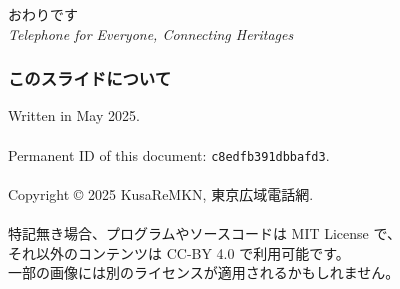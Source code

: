 \documentclass[
  lualatex,
  aspectratio=169,
  14pt
]{beamer}
\begin{document}
\begin{frame}[standout]
  おわりです\\[3\baselineskip]
  {\small\mdseries \textit{Telephone for Everyone, Connecting Heritages}}
  \\[-4\baselineskip]
\end{frame}

\begin{frame}
  \frametitle{このスライドについて}

  Written in May 2025.
  \\~\\[-.5\baselineskip]

  Permanent ID of this document: \texttt{c8edfb391dbbafd3}.
  \\~\\[-.5\baselineskip]

  Copyright © 2025 KusaReMKN, 東京広域電話網.
  \\~\\[-.5\baselineskip]

  特記無き場合、プログラムやソースコードは MIT License で、\\
  \hspace{1.5\zw}それ以外のコンテンツは CC-BY 4.0 で利用可能です。\\
  \hspace{1.5\zw}一部の画像には別のライセンスが適用されるかもしれません。
\end{frame}
\end{document}
